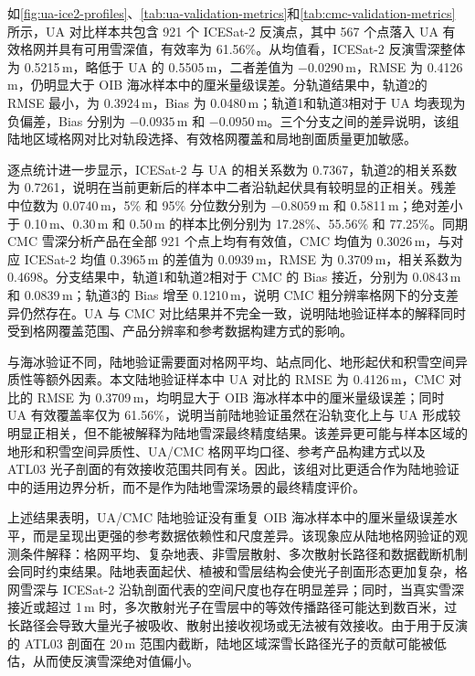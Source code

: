 如\autoref{fig:ua-ice2-profiles}、\autoref{tab:ua-validation-metrics}和\autoref{tab:cmc-validation-metrics}所示，UA 对比样本共包含 921 个 ICESat-2 反演点，其中 567 个点落入 UA 有效格网并具有可用雪深值，有效率为 61.56\%。从均值看，ICESat-2 反演雪深整体为 0.5215\,m，略低于 UA 的 0.5505\,m，二者差值为 $-0.0290$\,m，RMSE 为 0.4126\,m，仍明显大于 OIB 海冰样本中的厘米量级误差。分轨道结果中，轨道2的 RMSE 最小，为 0.3924\,m，Bias 为 0.0480\,m；轨道1和轨道3相对于 UA 均表现为负偏差，Bias 分别为 $-0.0935$\,m 和 $-0.0950$\,m。三个分支之间的差异说明，该组陆地区域格网对比对轨段选择、有效格网覆盖和局地剖面质量更加敏感。

逐点统计进一步显示，ICESat-2 与 UA 的相关系数为 0.7367，轨道2的相关系数为 0.7261，说明在当前更新后的样本中二者沿轨起伏具有较明显的正相关。残差中位数为 0.0740\,m，5\% 和 95\% 分位数分别为 $-0.8059$\,m 和 0.5811\,m；绝对差小于 0.10\,m、0.30\,m 和 0.50\,m 的样本比例分别为 17.28\%、55.56\% 和 77.25\%。同期 CMC 雪深分析产品在全部 921 个点上均有有效值，CMC 均值为 0.3026\,m，与对应 ICESat-2 均值 0.3965\,m 的差值为 0.0939\,m，RMSE 为 0.3709\,m，相关系数为 0.4698。分支结果中，轨道1和轨道2相对于 CMC 的 Bias 接近，分别为 0.0843\,m 和 0.0839\,m；轨道3的 Bias 增至 0.1210\,m，说明 CMC 粗分辨率格网下的分支差异仍然存在。UA 与 CMC 对比结果并不完全一致，说明陆地验证样本的解释同时受到格网覆盖范围、产品分辨率和参考数据构建方式的影响。

与海冰验证不同，陆地验证需要面对格网平均、站点同化、地形起伏和积雪空间异质性等额外因素。本文陆地验证样本中 UA 对比的 RMSE 为 0.4126\,m，CMC 对比的 RMSE 为 0.3709\,m，均明显大于 OIB 海冰样本中的厘米量级误差；同时 UA 有效覆盖率仅为 61.56\%，说明当前陆地验证虽然在沿轨变化上与 UA 形成较明显正相关，但不能被解释为陆地雪深最终精度结果。该差异更可能与样本区域的地形和积雪空间异质性、UA/CMC 格网平均口径、参考产品构建方式以及 ATL03 光子剖面的有效接收范围共同有关。因此，该组对比更适合作为陆地验证中的适用边界分析，而不是作为陆地雪深场景的最终精度评价。

上述结果表明，UA/CMC 陆地验证没有重复 OIB 海冰样本中的厘米量级误差水平，而是呈现出更强的参考数据依赖性和尺度差异。该现象应从陆地格网验证的观测条件解释：格网平均、复杂地表、非雪层散射、多次散射长路径和数据截断机制会同时约束结果。陆地表面起伏、植被和雪层结构会使光子剖面形态更加复杂，格网雪深与 ICESat-2 沿轨剖面代表的空间尺度也存在明显差异；同时，当真实雪深接近或超过 1\,m 时，多次散射光子在雪层中的等效传播路径可能达到数百米，过长路径会导致大量光子被吸收、散射出接收视场或无法被有效接收。由于用于反演的 ATL03 剖面在 20\,m 范围内截断，陆地区域深雪长路径光子的贡献可能被低估，从而使反演雪深绝对值偏小。

